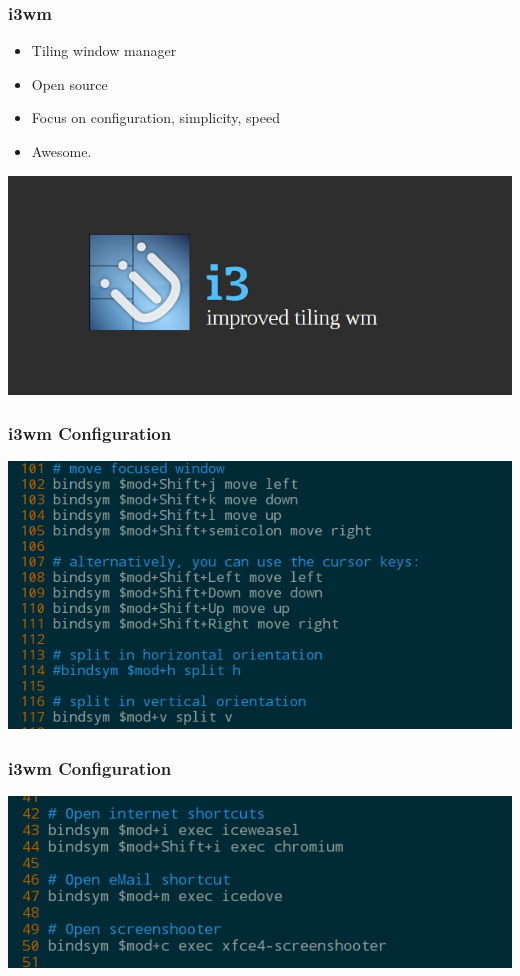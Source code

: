 \documentclass{beamer}
\begin{document}
\begin{frame}
  \frametitle{i3wm}
  \begin{itemize}
    \item Tiling window manager
    \item Open source
    \item Focus on configuration, simplicity, speed
    \item Awesome.
  \end{itemize}
  \includegraphics[scale=0.3]{images/i3wm}
\end{frame}

\begin{frame}
  \frametitle{i3wm Configuration}
  \includegraphics[scale=0.5]{images/i3-config-example}
\end{frame}

\begin{frame}
  \frametitle{i3wm Configuration}
  \includegraphics[scale=0.5]{images/i3-internet-config}
\end{frame}
\end{document}

